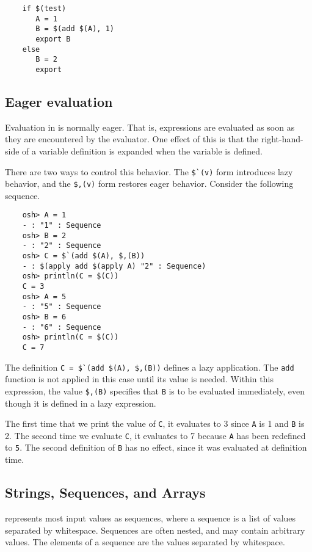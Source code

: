 \begin{verbatim}
    if $(test)
       A = 1
       B = $(add $(A), 1)
       export B
    else
       B = 2
       export
\end{verbatim}

\subsection{Eager evaluation}

Evaluation in  is normally eager.  That is, expressions
are evaluated as soon as they are encountered by the evaluator.  One effect
of this is that the right-hand-side of a variable definition is expanded
when the variable is defined.

There are two ways to control this behavior.  The \verb+$`(v)+ form
introduces lazy behavior, and the \verb+$,(v)+ form restores
eager behavior.  Consider the following sequence.

\begin{verbatim}
    osh> A = 1
    - : "1" : Sequence
    osh> B = 2
    - : "2" : Sequence
    osh> C = $`(add $(A), $,(B))
    - : $(apply add $(apply A) "2" : Sequence)
    osh> println(C = $(C))
    C = 3
    osh> A = 5
    - : "5" : Sequence
    osh> B = 6
    - : "6" : Sequence
    osh> println(C = $(C))
    C = 7
\end{verbatim}

The definition \verb+C = $`(add $(A), $,(B))+ defines a lazy application.
The \verb+add+ function is not applied in this case until its value is needed.
Within this expression, the value \verb+$,(B)+ specifies that \verb+B+ is
to be evaluated immediately, even though it is defined in a lazy expression.

The first time that we print the value of \verb+C+, it evaluates to 3
since \verb+A+ is 1 and \verb+B+ is 2.  The second time we evaluate \verb+C+,
it evaluates to 7 because \verb+A+ has been redefined to \verb+5+.  The second
definition of \verb+B+ has no effect, since it was evaluated at definition time.

\subsection{Strings, Sequences, and Arrays}

 represents most input values as sequences, where a sequence is a list
of values separated by whitespace.  Sequences are often nested, and may contain
arbitrary values.  The elements of a sequence are the values separated by whitespace.

